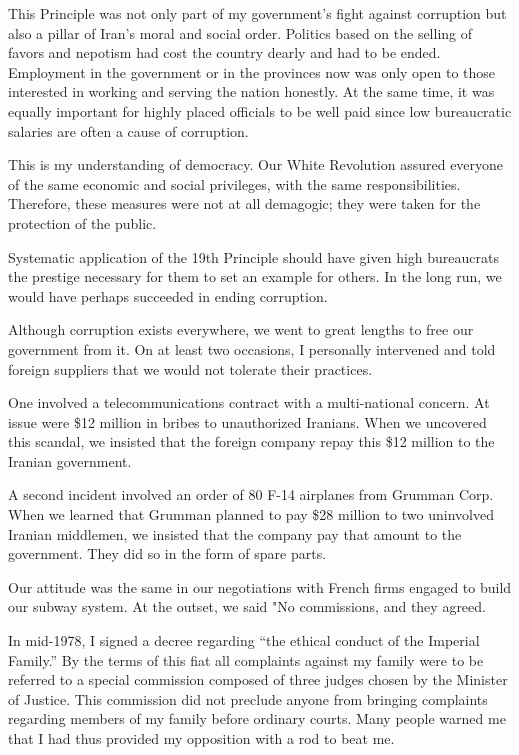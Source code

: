 This Principle was not only part of my government's fight against corruption but also a pillar of Iran's moral and social order. Politics based on the selling of favors and nepotism had cost the country dearly and had to be ended. Employment in the government or in the provinces now was only open to those interested in working and serving the nation honestly. At the same time, it was equally important for highly placed officials to be well paid since low bureaucratic salaries are often a cause of corruption. 

This is my understanding of democracy. Our White Revolution assured everyone of the same economic and social privileges, with the same responsibilities. Therefore, these measures were not at all demagogic; they were taken for the protection of the public. 

Systematic application of the 19th Principle should have given high bureaucrats the prestige necessary for them to set an example for others. In the long run, we would have perhaps succeeded in ending corruption. 

Although corruption exists everywhere, we went to great lengths to free our government from it. On at least two occasions, I personally intervened and told foreign suppliers that we would not tolerate their practices. 

One involved a telecommunications contract with a multi-national concern. At issue were \$12 million in bribes to unauthorized Iranians. When we uncovered this scandal, we insisted that the foreign company repay this \$12 million to the Iranian government. 

A second incident involved an order of 80 F-14 airplanes from Grumman Corp. When we learned that Grumman planned to pay \$28 million to two uninvolved Iranian middlemen, we insisted that the company pay that amount to the government. They did so in the form of spare parts. 

Our attitude was the same in our negotiations with French firms engaged to build our subway system. At the outset, we said "No commissions, and they agreed. 

In mid-1978, I signed a decree regarding “the ethical conduct of the Imperial Family.” By the terms of this fiat all complaints against my family were to be referred to a special commission composed of three judges chosen by the Minister of Justice. This commission did not preclude anyone from bringing complaints regarding members of my family before ordinary courts. Many people warned me that I had thus provided my opposition with a rod to beat me. 

